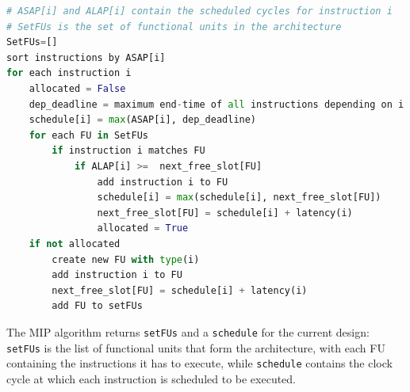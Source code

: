 \begin{lstlisting}[language=Python, caption={\small Modified Interval Partitioning Algorithm}, label={lst:modified_interval_partitioning}, basicstyle=\tiny]
# ASAP[i] and ALAP[i] contain the scheduled cycles for instruction i 
# SetFUs is the set of functional units in the architecture
SetFUs=[]
sort instructions by ASAP[i]
for each instruction i 
	allocated = False
	dep_deadline = maximum end-time of all instructions depending on i 
	schedule[i] = max(ASAP[i], dep_deadline)
	for each FU in SetFUs
		if instruction i matches FU 
			if ALAP[i] >=  next_free_slot[FU]
				add instruction i to FU 
				schedule[i] = max(schedule[i], next_free_slot[FU])
				next_free_slot[FU] = schedule[i] + latency(i)
				allocated = True
	if not allocated
		create new FU with type(i)
		add instruction i to FU 
		next_free_slot[FU] = schedule[i] + latency(i)
		add FU to setFUs 
\end{lstlisting}


The MIP algorithm returns \verb|setFUs| and a \verb|schedule| for the current design: \verb|setFUs| is the list of functional units that form the architecture, with each FU containing the instructions it has to execute, while \verb|schedule| contains the clock cycle at which each instruction is scheduled to be executed.

\vspace{-1mm}
